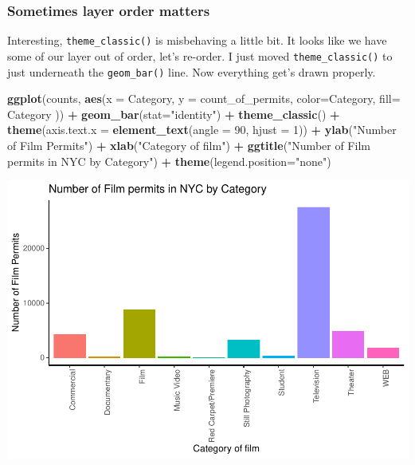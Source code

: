 \documentclass[]{book}
\newenvironment{Shaded}{\begin{snugshade}}{\end{snugshade}}
\newcommand{\KeywordTok}[1]{\textcolor[rgb]{0.13,0.29,0.53}{\textbf{#1}}}
\newcommand{\DataTypeTok}[1]{\textcolor[rgb]{0.13,0.29,0.53}{#1}}
\newcommand{\DecValTok}[1]{\textcolor[rgb]{0.00,0.00,0.81}{#1}}
\newcommand{\StringTok}[1]{\textcolor[rgb]{0.31,0.60,0.02}{#1}}
\newcommand{\OperatorTok}[1]{\textcolor[rgb]{0.81,0.36,0.00}{\textbf{#1}}}
\newcommand{\NormalTok}[1]{#1}
\begin{document}
\subsubsection{Sometimes layer order
matters}\label{sometimes-layer-order-matters}

Interesting, \texttt{theme\_classic()} is misbehaving a little bit. It
looks like we have some of our layer out of order, let's re-order. I
just moved \texttt{theme\_classic()} to just underneath the
\texttt{geom\_bar()} line. Now everything get's drawn properly.

\begin{Shaded}
\begin{Highlighting}[]
\KeywordTok{ggplot}\NormalTok{(counts, }\KeywordTok{aes}\NormalTok{(}\DataTypeTok{x =}\NormalTok{ Category, }\DataTypeTok{y =}\NormalTok{ count_of_permits, }
                   \DataTypeTok{color=}\NormalTok{Category, }
                   \DataTypeTok{fill=}\NormalTok{ Category )) }\OperatorTok{+}
\StringTok{  }\KeywordTok{geom_bar}\NormalTok{(}\DataTypeTok{stat=}\StringTok{"identity"}\NormalTok{) }\OperatorTok{+}\StringTok{ }
\StringTok{  }\KeywordTok{theme_classic}\NormalTok{() }\OperatorTok{+}
\StringTok{  }\KeywordTok{theme}\NormalTok{(}\DataTypeTok{axis.text.x =} \KeywordTok{element_text}\NormalTok{(}\DataTypeTok{angle =} \DecValTok{90}\NormalTok{, }\DataTypeTok{hjust =} \DecValTok{1}\NormalTok{)) }\OperatorTok{+}
\StringTok{  }\KeywordTok{ylab}\NormalTok{(}\StringTok{"Number of Film Permits"}\NormalTok{) }\OperatorTok{+}\StringTok{ }
\StringTok{  }\KeywordTok{xlab}\NormalTok{(}\StringTok{"Category of film"}\NormalTok{) }\OperatorTok{+}
\StringTok{  }\KeywordTok{ggtitle}\NormalTok{(}\StringTok{"Number of Film permits in NYC by Category"}\NormalTok{) }\OperatorTok{+}
\StringTok{  }\KeywordTok{theme}\NormalTok{(}\DataTypeTok{legend.position=}\StringTok{"none"}\NormalTok{) }
\end{Highlighting}
\end{Shaded}

\includegraphics{Statistics_Lab_files/figure-latex/1categoryJ-1.pdf}
\end{document}
